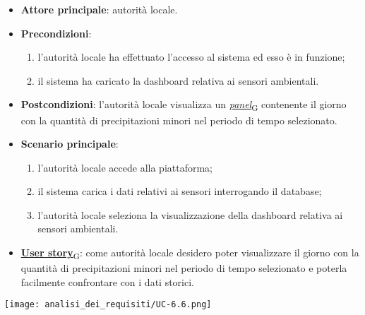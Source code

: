 \begin{itemize}
	\item \textbf{Attore principale}: autorità locale.
	\item \textbf{Precondizioni}:
	      \begin{enumerate}
		      \item l'autorità locale ha effettuato l'accesso al sistema ed esso è in funzione;
		      \item il sistema ha caricato la dashboard relativa ai sensori ambientali.
	      \end{enumerate}
	\item \textbf{Postcondizioni}: l'autorità locale visualizza un \href{https://7last.github.io/docs/rtb/documentazione-interna/glossario\#panel}{\textit{panel}\textsubscript{G}} contenente il giorno con la quantità di precipitazioni minori nel periodo di tempo selezionato.
	\item \textbf{Scenario principale}:
	      \begin{enumerate}
		      \item l'autorità locale accede alla piattaforma;
		      \item il sistema carica i dati relativi ai sensori interrogando il database;
		      \item l'autorità locale seleziona la visualizzazione della dashboard relativa ai sensori ambientali.
	      \end{enumerate}
	\item \href{https://7last.github.io/docs/rtb/documentazione-interna/glossario\#user-story}{\textbf{User story}\textsubscript{G}}:
	      come autorità locale desidero poter visualizzare il giorno con la quantità di precipitazioni minori nel periodo di tempo selezionato
	      e poterla facilmente confrontare con i dati storici.
\end{itemize}
\begin{center}
	\texttt{[image: analisi\_dei\_requisiti/UC-6.6.png]}
\end{center}


